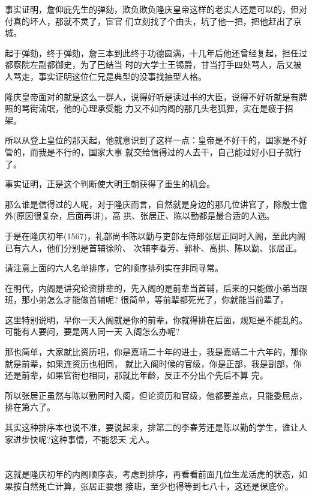 \documentclass[11pt,a4paper,onecolumn]{article}
\begin{document}
事实证明，詹仰庇先生的弹劾，欺负欺负隆庆皇帝这样的老实人还是可以的，但对付真的坏人，那就不灵了，宦官
们立刻找了个由头，坑了他一把，把他赶出了京城。

起于弹劾，终于弹劾，詹三本到此终于功德圆满，十几年后他还曾经复起，担任过都察院左副都御史，为了巴结当
时的大学士王锡爵，甘当打手四处骂人，后又被人骂走，事实证明这位仁兄是典型的没事找抽型人格。

隆庆皇帝面对的就是这么一群人，说得好听是读过书的大臣，说得不好听就是有牌照的骂街流氓，他的心理承受能
力又不如内阁的那几头老狐狸，实在是疲于招架。

所以从登上皇位的那天起，他就意识到了这样一点：皇帝是不好干的，国家是不好管的，而我是不行的，国家大事
就交给信得过的人去干，自己能过好小日子就行了。

事实证明，正是这个判断使大明王朝获得了重生的机会。

那么谁是信得过的人呢，对于隆庆而言，自然就是身边的那几位讲官了，除殷士儋外(原因很复杂，后面再讲)，高
拱、张居正、陈以勤都是最合适的人选。

于是在隆庆初年(1567)，礼部尚书陈以勤与吏部左侍郎张居正同时入阁，至此内阁已有六人，他们分别是首辅徐阶、
次辅李春芳、郭朴、高拱、陈以勤、张居正。

请注意上面的六人名单排序，它的顺序排列实在非同寻常。

在明代，内阁是讲究论资排辈的，先入阁的是前辈当首辅，后来的只能做小弟当跟班，那小弟怎么才能做首辅呢?
很简单，等前辈都死光了，你就能当前辈了。

这里特别说明，早你一天入阁就是你的前辈，你就得排在后面，规矩是不能乱的。可能有人要问，要是两人同一天
入阁怎么办呢?

那也简单，大家就比资历吧，你是嘉靖二十年的进士，我是嘉靖二十六年的，那你就是前辈，如果连资历也相同，
就比入阁时候的官级，你是正部，我是副部，你还是前辈，如果官衔也相同，那就比年龄，反正不分出个先后不算
完。

所以张居正虽然与陈以勤同时入阁，但论资历和官级，他都要差点，只能委屈点，排在第六了。

其实这种排序本也说不准，要说起来，排第二的李春芳还是陈以勤的学生，谁让人家进步快呢?这种事情，不能怨天
尤人。

\section[\thesection]{}

这就是隆庆初年的内阁顺序表，考虑到排序，再看看前面几位生龙活虎的状态，如果按自然死亡计算，张居正要想
接班，至少也得等到七八十，这还是保底价。
\end{document}
